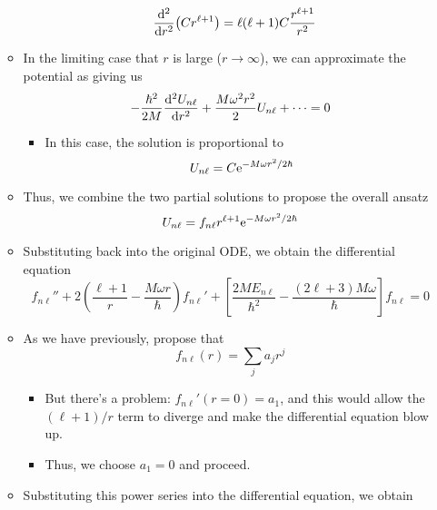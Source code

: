 \documentclass[../notes.tex]{subfiles}
\begin{document}
\begin{itemize}
\begin{itemize}
\begin{itemize}
\begin{align*}
                \dv[2]{r}(Cr^{\ell+1}) &= \ell(\ell+1)C\frac{r^{\ell+1}}{r^2}
            \end{align*}
        \end{itemize}
        \item In the limiting case that $r$ is large ($r\to\infty$), we can approximate the potential as giving us
        \begin{equation*}
            -\frac{\hbar^2}{2M}\dv[2]{U_{n\ell}}{r}+\frac{M\omega^2r^2}{2}U_{n\ell}+\cdots = 0
        \end{equation*}
        \begin{itemize}
            \item In this case, the solution is proportional to
            \begin{equation*}
                U_{n\ell} = C\e[-M\omega r^2/2\hbar]
            \end{equation*}
        \end{itemize}
        \item Thus, we combine the two partial solutions to propose the overall ansatz
        \begin{equation*}
            U_{n\ell} = f_{n\ell}r^{\ell+1}\e[-M\omega r^2/2\hbar]
        \end{equation*}
        \item Substituting back into the original ODE, we obtain the differential equation
        \begin{equation*}
            f_{n\ell}''+2\left( \frac{\ell+1}{r}-\frac{M\omega r}{\hbar} \right)f_{n\ell}'+\left[ \frac{2ME_{n\ell}}{\hbar^2}-\frac{(2\ell+3)M\omega}{\hbar} \right]f_{n\ell} = 0
        \end{equation*}
        \item As we have previously, propose that
        \begin{equation*}
            f_{n\ell}(r) = \sum_ja_jr^j
        \end{equation*}
        \begin{itemize}
            \item But there's a problem: $f_{n\ell}'(r=0)=a_1$, and this would allow the $(\ell+1)/r$ term to diverge and make the differential equation blow up.
            \item Thus, we choose $a_1=0$ and proceed.
        \end{itemize}
        \item Substituting this power series into the differential equation, we obtain
        \begin{equation*}

\end{equation*}
\end{itemize}
\end{itemize}
\end{document}
